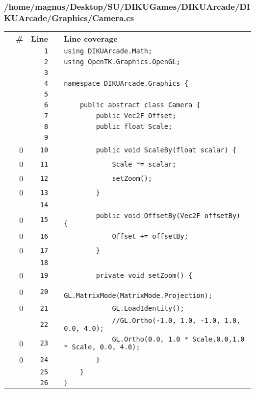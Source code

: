 \documentclass[a4paper,landscape,10pt]{article}
\begin{document}
\subsubsection{/home/magnus/Desktop/SU/DIKUGames/DIKUArcade/DIKUArcade/Graphics/Camera.cs}
\begin{longtable}[l]{lrrll}
\textbf{} & \textbf{\#} & \textbf{Line} & \textbf{} & \textbf{Line coverage}\\
\cellcolor{gray} &  & \verb~1~ & & \verb~using DIKUArcade.Math;~\\
\cellcolor{gray} &  & \verb~2~ & & \verb~using OpenTK.Graphics.OpenGL;~\\
\cellcolor{gray} &  & \verb~3~ & & \verb~~\\
\cellcolor{gray} &  & \verb~4~ & & \verb~namespace DIKUArcade.Graphics {~\\
\cellcolor{gray} &  & \verb~5~ & & \verb~~\\
\cellcolor{gray} &  & \verb~6~ & & \verb~    public abstract class Camera {~\\
\cellcolor{gray} &  & \verb~7~ & & \verb~        public Vec2F Offset;~\\
\cellcolor{gray} &  & \verb~8~ & & \verb~        public float Scale;~\\
\cellcolor{gray} &  & \verb~9~ & & \verb~~\\
\cellcolor{red} & 0 & \verb~10~ & & \verb~        public void ScaleBy(float scalar) {~\\
\cellcolor{red} & 0 & \verb~11~ & & \verb~            Scale *= scalar;~\\
\cellcolor{red} & 0 & \verb~12~ & & \verb~            setZoom();~\\
\cellcolor{red} & 0 & \verb~13~ & & \verb~        }~\\
\cellcolor{gray} &  & \verb~14~ & & \verb~~\\
\cellcolor{red} & 0 & \verb~15~ & & \verb~        public void OffsetBy(Vec2F offsetBy) {~\\
\cellcolor{red} & 0 & \verb~16~ & & \verb~            Offset += offsetBy;~\\
\cellcolor{red} & 0 & \verb~17~ & & \verb~        }~\\
\cellcolor{gray} &  & \verb~18~ & & \verb~~\\
\cellcolor{red} & 0 & \verb~19~ & & \verb~        private void setZoom() {~\\
\cellcolor{red} & 0 & \verb~20~ & & \verb~            GL.MatrixMode(MatrixMode.Projection);~\\
\cellcolor{red} & 0 & \verb~21~ & & \verb~            GL.LoadIdentity();~\\
\cellcolor{gray} &  & \verb~22~ & & \verb~            //GL.Ortho(-1.0, 1.0, -1.0, 1.0, 0.0, 4.0);~\\
\cellcolor{red} & 0 & \verb~23~ & & \verb~            GL.Ortho(0.0, 1.0 * Scale,0.0,1.0 * Scale, 0.0, 4.0);~\\
\cellcolor{red} & 0 & \verb~24~ & & \verb~        }~\\
\cellcolor{gray} &  & \verb~25~ & & \verb~    }~\\
\cellcolor{gray} &  & \verb~26~ & & \verb~}~\\
\end{longtable}
\newpage
\end{document}

